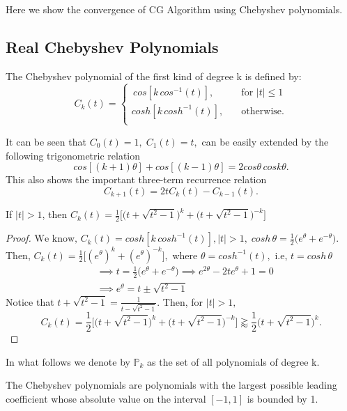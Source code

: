 \documentclass[10pt,a4paper]{article}
\begin{document}
Here we show the convergence of CG Algorithm using Chebyshev polynomials.

\subsection{Real Chebyshev Polynomials}

\begin{mydef}
The Chebyshev polynomial of the first kind of degree k is defined by:
\[   
C_k(t) = 
     \begin{cases}	
      \, cos[k\,cos^{-1}(t)], &\quad\text{for }|t|\le 1\\
       cosh[k\,cosh^{-1}(t)], &\quad\text{otherwise.}\\
     \end{cases}
\]
\end{mydef}

It can be seen that $C_0(t)=1,\;C_1(t)=t,$ can be easily extended by the following trigonometric relation
$$cos[(k+1)\theta]+cos[(k-1)\theta]=2cos\theta\,cosk\theta.$$
This also shows the important three-term recurrence relation
$$C_{k+1}(t)=2tC_k(t)-C_{k-1}(t).$$

\begin{prop}
If $|t|>1$, then $C_k(t)=\frac{1}{2}\bigg[\Big(t+\sqrt{t^2-1}\Big)^k+\Big(t+\sqrt{t^2-1}\Big)^{-k}\bigg]$
\end{prop}

\begin{proof}
$\text{We know, }C_k(t) = cosh[k\,cosh^{-1}(t)],|t|>1,\;cosh\,\theta=\frac{1}{2}\big(e^\theta+e^{-\theta}\big).$ Then,
$C_k(t) = \frac{1}{2}\Big[(e^\theta)^k+(e^\theta)^{-k}\Big],$ where $\theta = cosh^{-1}(t),$ i.e, $t=cosh\,\theta$ 
\begin{align*}
&\implies t = \frac{1}{2}\big(e^\theta+e^{-\theta}\big) \implies e^{2\theta}-2te^\theta+1=0 \\
&\implies e^\theta = t \pm \sqrt{t^2-1}
\end{align*}
Notice that $t + \sqrt{t^2-1}=\frac{1}{t - \sqrt{t^2-1}}.$ Then, for $|t|>1,$
$$C_k(t)=\frac{1}{2}\bigg[\Big(t+\sqrt{t^2-1}\Big)^k+\Big(t+\sqrt{t^2-1}\Big)^{-k}\bigg]\gtrapprox\frac{1}{2}\Big(t+\sqrt{t^2-1}\Big)^k.$$
\end{proof}

In what follows  we denote by $\mathbb{P}_k$ as the set of all polynomials of degree k.

\begin{remark}
The Chebyshev polynomials are polynomials with the largest possible leading coefficient whose absolute value on the interval $[-1,1]$ is bounded by 1.
\end{remark}
\end{document}
